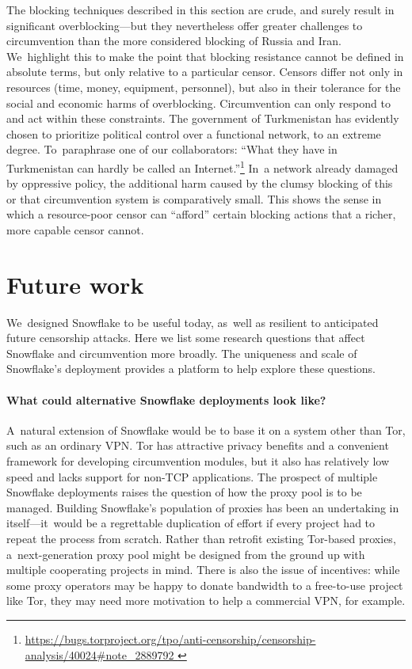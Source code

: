 \documentclass[letterpaper,twocolumn]{article}
\newlength{\urlfootnotesize}
\newcommand{\urlfootnote}[1]{\footnote{
\raggedright\hangindent\footnotemargin%
\fontsize{\urlfootnotesize}{\urlfootnotesize}\selectfont%
\url{#1}
}}
\begin{document}
The blocking techniques described in this section are crude,
and surely result in significant overblocking---but
they nevertheless offer greater challenges to circumvention
than the more considered blocking of Russia and Iran.
We~highlight this to make the point that blocking resistance
cannot be defined in absolute terms,
but only relative to a particular censor.
Censors differ not only in resources
(time, money, equipment, personnel),
but also in their tolerance
for the social and economic harms of overblocking.
Circumvention can only respond to and act within these constraints.
The government of Turkmenistan has evidently chosen
to prioritize political control
over a functional network, to an extreme degree.
To~paraphrase one of our collaborators:
``What they have in Turkmenistan can hardly be called an Internet.''\urlfootnote{
https://bugs.torproject.org/tpo/anti-censorship/censorship-analysis/40024\#note_2889792
}
In~a network already damaged by oppressive policy,
the additional harm caused by the clumsy blocking of
this or that circumvention system is comparatively small.
This shows the sense in which a resource-poor censor
can ``afford'' certain blocking actions
that a richer, more capable censor cannot.

\section{Future work}
\label{sec:future}

We~designed Snowflake to be useful today,
as~well as resilient to anticipated future censorship attacks.
Here we list some research questions that affect Snowflake
and circumvention more broadly.
The uniqueness and scale of Snowflake's deployment
provides a platform to help explore these questions.

\paragraph{What could alternative Snowflake deployments look like?}

A~natural extension of Snowflake would be
to base it on a system other than Tor, such as an ordinary VPN.
Tor has attractive privacy benefits
and a convenient framework for developing circumvention modules,
but it also has relatively low speed and lacks
support for non-TCP applications.
The prospect of multiple Snowflake deployments
raises the question of
how the proxy pool is to be managed.
Building Snowflake's population of proxies
has been an undertaking in itself---it~would
be a regrettable duplication of effort
if every project had to repeat the process from scratch.
Rather than retrofit existing Tor-based proxies,
a~next-generation proxy pool might be designed
from the ground up with multiple cooperating projects in mind.
There is also the issue of incentives:
while some proxy operators may be happy to donate
bandwidth to a free-to-use project like Tor,
they may need more motivation to help a commercial VPN,
for example.
\end{document}
